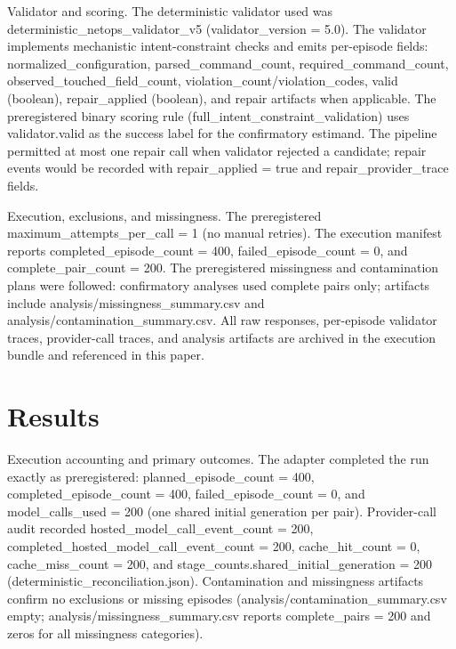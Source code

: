 \documentclass[conference]{IEEEtran}
\begin{document}
Validator and scoring. The deterministic validator used was deterministic\_netops\_validator\_v5 (validator\_version = 5.0). The validator implements mechanistic intent-constraint checks and emits per-episode fields: normalized\_configuration, parsed\_command\_count, required\_command\_count, observed\_touched\_field\_count, violation\_count/violation\_codes, valid (boolean), repair\_applied (boolean), and repair artifacts when applicable. The preregistered binary scoring rule (full\_intent\_constraint\_validation) uses validator.valid as the success label for the confirmatory estimand. The pipeline permitted at most one repair call when validator rejected a candidate; repair events would be recorded with repair\_applied = true and repair\_provider\_trace fields.

Execution, exclusions, and missingness. The preregistered maximum\_attempts\_per\_call = 1 (no manual retries). The execution manifest reports completed\_episode\_count = 400, failed\_episode\_count = 0, and complete\_pair\_count = 200. The preregistered missingness and contamination plans were followed: confirmatory analyses used complete pairs only; artifacts include analysis/missingness\_summary.csv and analysis/contamination\_summary.csv. All raw responses, per-episode validator traces, provider-call traces, and analysis artifacts are archived in the execution bundle and referenced in this paper.

\section{Results}
Execution accounting and primary outcomes. The adapter completed the run exactly as preregistered: planned\_episode\_count = 400, completed\_episode\_count = 400, failed\_episode\_count = 0, and model\_calls\_used = 200 (one shared initial generation per pair). Provider-call audit recorded hosted\_model\_call\_event\_count = 200, completed\_hosted\_model\_call\_event\_count = 200, cache\_hit\_count = 0, cache\_miss\_count = 200, and stage\_counts.shared\_initial\_generation = 200 (deterministic\_reconciliation.json). Contamination and missingness artifacts confirm no exclusions or missing episodes (analysis/contamination\_summary.csv empty; analysis/missingness\_summary.csv reports complete\_pairs = 200 and zeros for all missingness categories).
\end{document}
